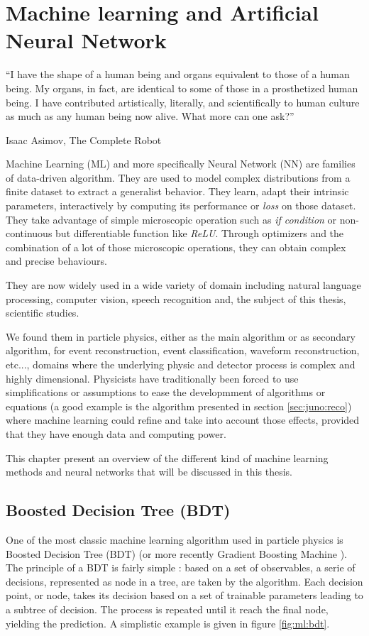 \chapter{Machine learning and Artificial Neural Network}
\label{sec:ml}

\epigraph{``I have the shape of a human being and organs equivalent to those of a human being. My organs, in fact, are identical to some of those in a prosthetized human being. I have contributed artistically, literally, and scientifically to human culture as much as any human being now alive. What more can one ask?''}{Isaac Asimov, The Complete Robot }

Machine Learning (ML) and more specifically Neural Network (NN) are families of data-driven algorithm. They are used to model complex distributions from a finite dataset to extract a generalist behavior. They learn, adapt their intrinsic parameters, interactively by computing its performance or \textit{loss} on those dataset. They take advantage of simple microscopic operation such as \textit{if condition} or non-continuous but differentiable function like \textit{ReLU}. Through optimizers and the combination of a lot of those microscopic operations, they can obtain complex and precise behaviours.

They are now widely used in a wide variety of domain including natural language processing, computer vision, speech recognition and, the subject of this thesis, scientific studies.

We found them in particle physics, either as the main algorithm or as secondary algorithm, for event reconstruction, event classification, waveform reconstruction, etc..., domains where the underlying physic and detector process is complex and highly dimensional. Physicists have traditionally been forced to use simplifications or assumptions to ease the developmment of algorithms or equations (a good example is the algorithm presented in section \ref{sec:juno:reco}) where machine learning could refine and take into account those effects, provided that they have enough data and computing power.

This chapter present an overview of the different kind of machine learning methods and neural networks that will be discussed in this thesis.
\section{Boosted Decision Tree (BDT)}
\label{sec:ml:bdt}

One of the most classic machine learning algorithm used in particle physics is Boosted Decision Tree (BDT) \cite{breiman_classification_2017} (or more recently Gradient Boosting Machine \cite{friedman_greedy_2001}). The principle of a BDT is fairly simple : based on a set of observables, a serie of decisions, represented as node in a tree, are taken by the algorithm. Each decision point, or node, takes its decision based on a set of trainable parameters leading to a subtree of decision. The process is repeated until it reach the final node, yielding the prediction. A simplistic example is given in figure \ref{fig:ml:bdt}.

